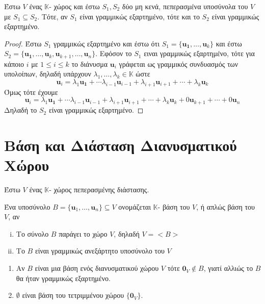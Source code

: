 \begin{thm}
  Έστω $V$ ένας $ \mathbb{K} $- χώρος και έστω $ S_{1}, S_{2} $ δύο μη κενά, 
  πεπερασμένα υποσύνολα του $V$ με $ S_{1} \subseteq S_{2} $. 
  Τότε, αν $ S_{1} $ είναι γραμμικώς εξαρτημένο, τότε και το $ S_{2} $ 
  είναι γραμμικώς εξαρτημένο.
\end{thm}
\begin{proof}
\item {}
  Έστω $ S_{1} $ γραμμικώς εξαρτημένο και έστω ότι $ S_{1} = \{ \mathbf{u_{1}},
    \ldots, \mathbf{u}_{k} \} $ και έστω $ S_{2} = \{ \mathbf{u_{1}}, \ldots, 
  \mathbf{u}_{k}, \mathbf{u}_{k+1}, \ldots, \mathbf{u}_{n} \} $. 
  Εφόσον το $ S_{1} $ ειναι γραμμικώς εξαρτημένο, τότε για κάποιο $ i $ με 
  $ 1 \leq i \leq k $ το διάνυσμα $ \mathbf{u}_{i} $ γράφεται 
  ως γραμμικός συνδυασμός των υπολοίπων, δηλαδή υπάρχουν $ \lambda _{1}, \ldots, 
  \lambda _{k} \in \mathbb{K} $ ώστε
  \[
    \mathbf{u}_{i} = \lambda _{1} \mathbf{u_{1}}+ \cdots \lambda _{i-1} 
    \mathbf{u}_{i-1} + \lambda _{i+1} \mathbf{u}_{i+1} + \cdots + 
    \lambda _{k} \mathbf{u}_{k}
  \] 
  Όμως τότε έχουμε 
  \[
    \mathbf{u}_{i} = \lambda _{1} \mathbf{u_{1}}+ \cdots \lambda _{i-1} 
    \mathbf{u}_{i-1} + \lambda _{i+1} \mathbf{u}_{i+1} + \cdots + 
    \lambda _{k} \mathbf{u}_{k} + 0 \mathbf{u}_{k+1} + \cdots + 0 \mathbf{u}_{n}
  \] 
  Δηλαδή το $ S_{2} $ είναι γραμμικώς εξαρτημένο.
\end{proof}

\section{Βάση και Διάσταση Διανυσματικού Χώρου}

\begin{dfn}
  Έστω $ V $ ένας $ \mathbb{K} $- χώρος πεπερασμένης διάστασης.

  Ένα υποσύνολο $ B = \{ \mathbf{u}_{1} , \ldots, \mathbf{u}_{n} \} \subseteq V $ 
  ονομάζεται  {\color {Col2} $ \mathbb{K} $- βάση} του $V$, ή απλώς 
  \textcolor{Col2}{βάση} του $V$, αν 
  \begin{enumerate}[i)]
    \item Το σύνολο $B$ παράγει το χώρο $V$, δηλαδή $ V = < B >  $ 
    \item Το $B$ είναι γραμμικώς ανεξάρτητο υποσύνολο του $V$
  \end{enumerate}
\end{dfn}

\begin{rems}
\item {}
  \begin{enumerate}
    \item Αν $B$ είναι μια βάση ενός διανυσματικού χώρου $V$ τότε 
      $ \mathbf{0}_{V} \not \in B $, γιατί αλλιώς το $B$ θα ήταν γραμμικώς 
      εξαρτημένο.
    \item $ \emptyset $ είναι βάση του τετριμμένου χώρου $ \{ \mathbf{0}_{V} \} $.
  \end{enumerate}
\end{rems}

